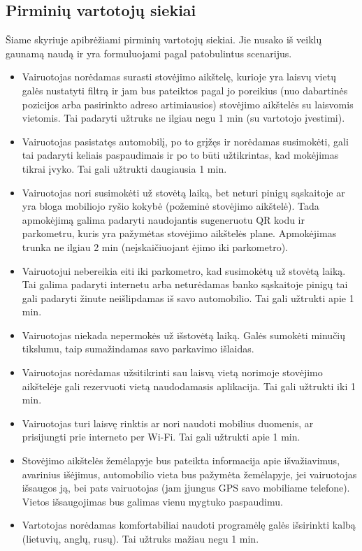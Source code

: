 \documentclass{VUMIFPSkursinis}
\begin{document}
\subsection{Pirminių vartotojų siekiai}
Šiame skyriuje apibrėžiami pirminių vartotojų siekiai. Jie nusako iš veiklų gaunamą naudą  ir yra formuluojami pagal patobulintus scenarijus.
\begin{itemize}
	\item Vairuotojas norėdamas surasti stovėjimo aikštelę, kurioje yra laisvų vietų galės nustatyti filtrą ir jam bus pateiktos pagal jo poreikius (nuo dabartinės pozicijos arba pasirinkto adreso artimiausios) stovėjimo aikštelės su laisvomis vietomis. Tai padaryti užtruks ne ilgiau negu 1 min (su vartotojo įvestimi).
	\item Vairuotojas pasistatęs automobilį, po to grįžęs ir norėdamas susimokėti, gali tai padaryti keliais paspaudimais ir po to būti užtikrintas, kad mokėjimas tikrai įvyko. Tai gali užtrukti daugiausia 1 min.
	\item Vairuotojas nori susimokėti už stovėtą laiką, bet neturi pinigų sąskaitoje ar yra bloga mobiliojo ryšio kokybė (požeminė stovėjimo aikštelė). Tada apmokėjimą galima padaryti naudojantis sugeneruotu QR kodu ir parkometru, kuris yra pažymėtas stovėjimo aikštelės plane. Apmokėjimas trunka ne ilgiau 2 min (neįskaičiuojant ėjimo iki parkometro).
	\item Vairuotojui nebereikia eiti iki parkometro, kad susimokėtų už stovėtą laiką. Tai galima padaryti internetu arba neturėdamas banko sąskaitoje pinigų tai gali padaryti žinute neišlipdamas iš savo automobilio. Tai gali užtrukti apie 1 min.
	\item Vairuotojas niekada nepermokės už išstovėtą laiką. Galės sumokėti minučių tikslumu, taip sumažindamas savo parkavimo išlaidas. 
	\item Vairuotojas norėdamas užsitikrinti sau laisvą vietą norimoje stovėjimo aikštelėje gali rezervuoti vietą naudodamasis aplikacija. Tai gali užtrukti iki 1 min.
	\item Vairuotojas turi laisvę rinktis ar nori naudoti mobilius duomenis, ar prisijungti prie interneto per Wi-Fi. Tai gali užtrukti apie 1 min.
	\item Stovėjimo aikštelės žemėlapyje bus pateikta informacija apie išvažiavimus, avarinius išėjimus, automobilio vieta bus pažymėta žemėlapyje, jei vairuotojas išsaugos ją, bei pats vairuotojas (jam įjungus GPS savo mobiliame telefone). Vietos išsaugojimas bus galimas vienu mygtuko paspaudimu.
	\item Vartotojas norėdamas komfortabiliai naudoti programėlę galės išsirinkti kalbą (lietuvių, anglų, rusų). Tai užtruks mažiau negu 1 min.

\end{itemize}
\end{document}
